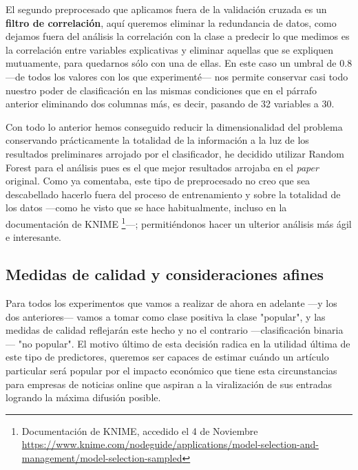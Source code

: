 \documentclass{article}
\newcommand{\img}[2]{
\noindent\makebox[\textwidth][c]{\texttt{[image: \#1]}}%
}
\begin{document}
\img{variance}{1}

El segundo preprocesado que aplicamos fuera de la validación cruzada es un \textbf{filtro de correlación}, aquí queremos eliminar la redundancia de datos, como dejamos fuera del análisis la correlación con la clase a predecir lo que medimos es la correlación entre variables explicativas y eliminar aquellas que se expliquen mutuamente, para quedarnos sólo con una de ellas. En este caso un umbral de $0.8$ ---de todos los valores con los que experimenté--- nos permite conservar casi todo nuestro poder de clasificación en las mismas condiciones que en el párrafo anterior eliminando dos columnas más, es decir, pasando de 32 variables a 30.

\img{corr2}{1}

Con todo lo anterior hemos conseguido reducir la dimensionalidad del problema conservando prácticamente la totalidad de la información a la luz de los resultados preliminares arrojado por el clasificador, he decidido utilizar Random Forest para el análisis pues es el que mejor resultados arrojaba en el \textit{paper} original. Como ya comentaba, este tipo de preprocesado no creo que sea descabellado hacerlo fuera del proceso de entrenamiento y sobre la totalidad de los datos ---como he visto que se hace habitualmente, incluso en la documentación de KNIME \footnote{Documentación de KNIME, accedido el 4 de Noviembre \url{https://www.knime.com/nodeguide/applications/model-selection-and-management/model-selection-sampled}}---; permitiéndonos hacer un ulterior análisis más ágil e interesante.

\subsection{Medidas de calidad y consideraciones afines}

Para todos los experimentos que vamos a realizar de ahora en adelante ---y los dos anteriores--- vamos a tomar como clase positiva la clase "popular", y las medidas de calidad reflejarán este hecho y no el contrario ---clasificación binaria--- "no popular". El motivo último de esta decisión radica en la utilidad última de este tipo de predictores, queremos ser capaces de estimar cuándo un artículo particular será popular por el impacto económico que tiene esta circunstancias para empresas de noticias online que aspiran a la viralización de sus entradas logrando la máxima difusión posible. 
\end{document}
